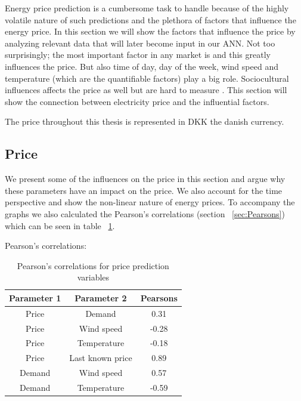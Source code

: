 Energy price prediction is a cumbersome task to handle because of the highly volatile nature of such predictions \cite{pjmForecast, yamin2004adaptive} and the plethora of factors that influence the energy price\cite{singhal2011electricity}. In this section we will show the factors that influence the price by analyzing relevant data that will later become input in our ANN. Not too surprisingly; the most important factor in any market is  and this greatly influences the price. But also time of day, day of the week, wind speed and temperature (which are the quantifiable factors) play a big role. Sociocultural influences affects the price as well but are hard to measure \cite{singhal2011electricity}. This section will show the connection between electricity price and the influential factors.

The price throughout this thesis is represented in DKK the danish currency.

\subsection{Price}\label{sec:Price}
We present some of the influences on the price in this section and argue why these parameters have an impact on the price. We also account for the time perspective and show the non-linear nature of energy prices. To accompany the graphs we also calculated the Pearson's correlations (section ~\ref{sec:Pearsons}) which can be seen in table ~\ref{table:pearsonsPriceVariables}.

Pearson's correlations:
\begin{table}[H]
\centering  %
\begin{tabular}{|c|c|c|} %
 \hline
 Parameter 1 & Parameter 2 & Pearsons \\ [0.5ex] %
\hline                  %
Price & Demand & 0.31 \\ \hline
Price & Wind speed & -0.28  \\ \hline
Price & Temperature & -0.18 \\ \hline
Price & Last known price & 0.89 \\ \hline
Demand & Wind speed & 0.57 \\ \hline
Demand & Temperature & -0.59 \\ \hline
\end{tabular}
\caption{Pearson's correlations for price prediction variables} %
\label{table:pearsonsPriceVariables} %
\end{table}

